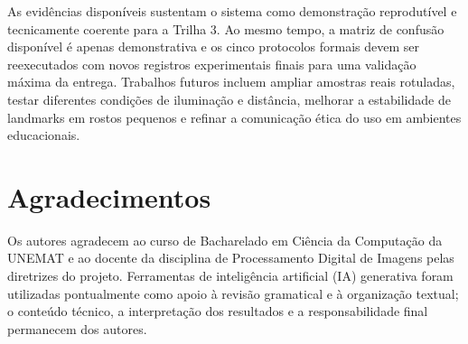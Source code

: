 \documentclass[12pt]{article}
\begin{document}
As evidências disponíveis sustentam o sistema como demonstração reprodutível e tecnicamente coerente para a Trilha 3. Ao mesmo tempo, a matriz de confusão disponível é apenas demonstrativa e os cinco protocolos formais devem ser reexecutados com novos registros experimentais finais para uma validação máxima da entrega. Trabalhos futuros incluem ampliar amostras reais rotuladas, testar diferentes condições de iluminação e distância, melhorar a estabilidade de landmarks em rostos pequenos e refinar a comunicação ética do uso em ambientes educacionais.

\section*{Agradecimentos}

Os autores agradecem ao curso de Bacharelado em Ciência da Computação da UNEMAT e ao docente da disciplina de Processamento Digital de Imagens pelas diretrizes do projeto. Ferramentas de inteligência artificial (IA) generativa foram utilizadas pontualmente como apoio à revisão gramatical e à organização textual; o conteúdo técnico, a interpretação dos resultados e a responsabilidade final permanecem dos autores.



\end{document}
